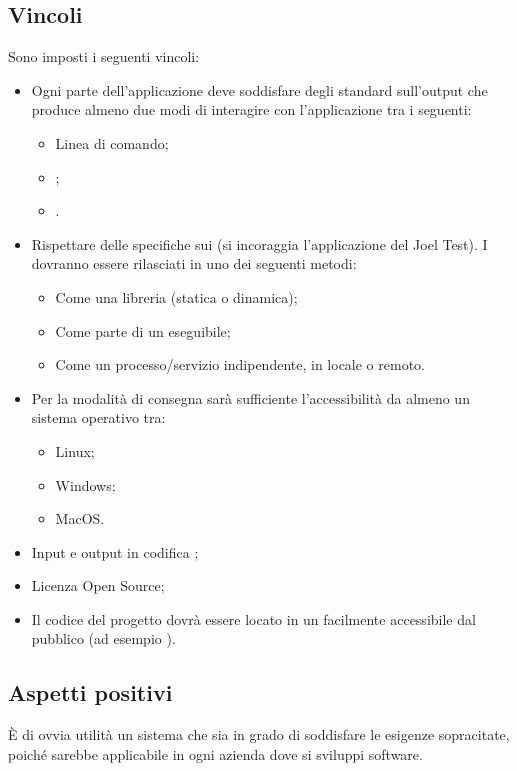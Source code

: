 \subsection{Vincoli}
Sono imposti i seguenti vincoli:
\begin{itemize}
\item Ogni parte dell'applicazione deve soddisfare degli standard sull'output che produce almeno due modi di interagire con l'applicazione tra i seguenti:
\begin{itemize}
\item Linea di comando;
\item {};
\item {}.
\end{itemize}

\item Rispettare delle specifiche sui  (si incoraggia l'applicazione del Joel Test). I  dovranno essere rilasciati in uno dei seguenti metodi:
\begin{itemize}
\item Come una libreria (statica o dinamica);
\item Come parte di un eseguibile;
\item Come un processo/servizio indipendente, in locale o remoto.
\end{itemize}

\item Per la modalità di consegna sarà sufficiente l'accessibilità da almeno un sistema operativo tra:
\begin{itemize}
\item Linux;
\item Windows;
\item MacOS.
\end{itemize}

\item Input e output in codifica ;
\item Licenza Open Source;
\item Il codice del progetto dovrà essere locato in un  facilmente accessibile dal pubblico (ad esempio ).
\end{itemize}

\subsection{Aspetti positivi}
È di ovvia utilità un sistema che sia in grado di soddisfare le esigenze sopracitate, poiché sarebbe applicabile in ogni azienda dove si sviluppi software.

